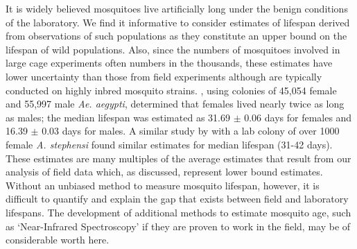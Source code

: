 \documentclass[]{article}
\begin{document}
It is widely believed mosquitoes live artificially long under the benign
conditions of the laboratory. We find it informative to consider
estimates of lifespan derived from observations of such populations as
they constitute an upper bound on the lifespan of wild populations.
Also, since the numbers of mosquitoes involved in large cage experiments
often numbers in the thousands, these estimates have lower uncertainty
than those from field experiments although are typically conducted on
highly inbred mosquito strains. \cite{styer2007mosquitoes}, using colonies of
45,054 female and 55,997 male \emph{Ae. aegypti}, determined that
females lived nearly twice as long as males; the median lifespan was
estimated as 31.69 $\pm$ 0.06 days for females and 16.39 $\pm$ 0.03 days
for males. A similar study by \cite{dawes2009anopheles} with a lab colony of
over 1000 female \emph{A. stephensi} found similar estimates for median
lifespan (31-42 days). These estimates are many multiples of the average
estimates that result from our analysis of field data which, as
discussed, represent lower bound estimates. Without an unbiased method
to measure mosquito lifespan, however, it is difficult to quantify and
explain the gap that exists between field and laboratory lifespans. The
development of additional methods to estimate mosquito age, such as
`Near-Infrared Spectroscopy' \citep{mayagaya2009non,sikulu2011evaluating,lambert2018monitoring} if they are proven to work in the field,
may be of considerable worth here.
\end{document}
